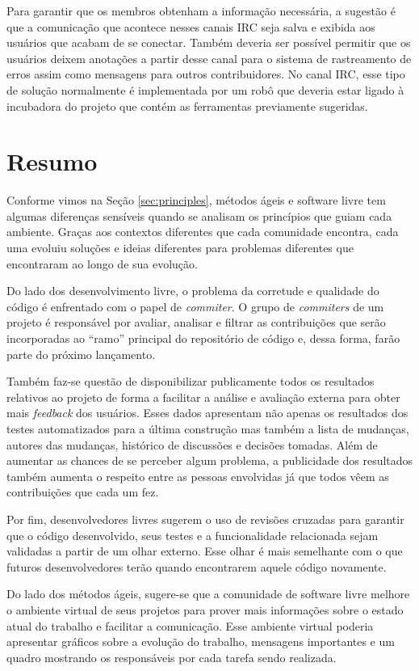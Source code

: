 Para garantir que os membros obtenham a informação necessária, a
sugestão é que a comunicação que acontece nesses canais IRC seja salva
e exibida aos usuários que acabam de se conectar. Também deveria ser
possível permitir que os usuários deixem anotações a partir desse
canal para o sistema de rastreamento de erros assim como mensagens
para outros contribuidores. No canal IRC, esse tipo de solução
normalmente é implementada por um robô que deveria estar ligado à
incubadora do projeto que contém as ferramentas previamente sugeridas.

\section{Resumo}
\label{sec:resumo-diffs}

Conforme vimos na Seção \ref{sec:principles}, métodos ágeis e software
livre tem algumas diferenças sensíveis quando se analisam os
princípios que guiam cada ambiente. Graças aos contextos diferentes
que cada comunidade encontra, cada uma evoluiu soluções e ideias
diferentes para problemas diferentes que encontraram ao longo de sua
evolução.

Do lado dos desenvolvimento livre, o problema da corretude e qualidade
do código é enfrentado com o papel de \emph{commiter}. O grupo de
\emph{commiters} de um projeto é responsável por avaliar, analisar e
filtrar as contribuições que serão incorporadas ao ``ramo'' principal
do repositório de código e, dessa forma, farão parte do próximo
lançamento.

Também faz-se questão de disponibilizar publicamente todos os
resultados relativos ao projeto de forma a facilitar a análise e
avaliação externa para obter mais \textit{feedback} dos
usuários. Esses dados apresentam não apenas os resultados dos testes
automatizados para a última construção mas também a lista de mudanças,
autores das mudanças, histórico de discussões e decisões tomadas. Além
de aumentar as chances de se perceber algum problema, a
publicidade dos resultados também aumenta o respeito entre as pessoas
envolvidas já que todos vêem as contribuições que cada um fez.

Por fim, desenvolvedores livres sugerem o uso de revisões cruzadas
para garantir que o código desenvolvido, seus testes e a
funcionalidade relacionada sejam validadas a partir de um olhar
externo. Esse olhar é mais semelhante com o que futuros
desenvolvedores terão quando encontrarem aquele código novamente.

Do lado dos métodos ágeis, sugere-se que a comunidade de software
livre melhore o ambiente virtual de seus projetos para prover mais
informações sobre o estado atual do trabalho e facilitar a
comunicação. Esse ambiente virtual poderia apresentar gráficos sobre a
evolução do trabalho, mensagens importantes e um quadro mostrando os
responsáveis por cada tarefa sendo realizada.

